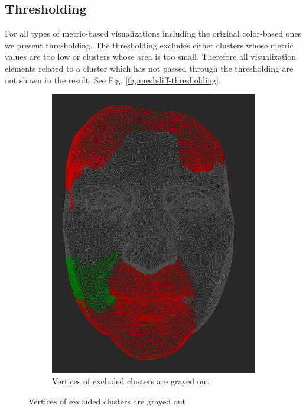 \subsection{Thresholding}
\label{subsec:analysis-visualizations-thresholding}

For all types of metric-based visualizations including the original color-based ones we present thresholding. The thresholding excludes either clusters whose metric values are too low or clusters whose area is too small. Therefore all visualization elements related to a cluster which has not passed through the thresholding are not shown in the result. See Fig. \ref{fig:meshdiff-thresholding}.

\begin{figure}[h]
\centering
	\begin{subfigure}{0.4\textwidth}
	\includegraphics[width=\textwidth]{./img/meshdiff-thresholding-clustercolor-length3.PNG}
    \caption{Vertices of excluded clusters are grayed out}

\end{subfigure}
\end{figure}
